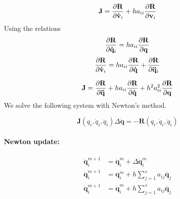 \documentclass[pdftex,11pt,letter]{article}
\begin{document}
\begin{equation}
  \mathbf{J} = \dfrac{\partial \mathbf{R}}{\partial \mathbf{\dot{v}}_{i}} + h a_{ii}
  \dfrac{\partial \mathbf{R}}{\partial \mathbf{v}_{i}}
\end{equation}
Using the relations
\begin{equation}
  \dfrac{\partial \mathbf{R}}{\partial \mathbf{\dot{q}}_{i}} = h a_{ii} \dfrac{\partial \mathbf{R}}{\partial \mathbf{{q}}}
\end{equation}
\begin{equation}
  \dfrac{\partial \mathbf{R}}{\partial \mathbf{\dot{v}}_{i}} = h a_{ii} \dfrac{\partial \mathbf{R}}{\partial \mathbf{\dot{q}}} + \dfrac{\partial \mathbf{R}}{\partial \mathbf{\ddot{q}}_{i}}
\end{equation}

\begin{equation}
  \mathbf{J} = \dfrac{\partial \mathbf{R}}{\partial \mathbf{\ddot{q}}} + h a_{ii}
  \dfrac{\partial \mathbf{R}}{\partial \mathbf{\dot{q}}} + h^2 a_{ii}^2
  \dfrac{\partial \mathbf{R}}{\partial \mathbf{{q}}}
\end{equation}
We solve the following system with Newton's method.

\begin{equation}
 \mathbf{J} \left(q_i,\dot{q}_i,\ddot{q}_i\right) \Delta\mathbf{\dot{q}} = -\mathbf{R}  \left(q_i,\dot{q}_i,\ddot{q}_i\right)
\end{equation}

\paragraph{Newton update:}

\begin{equation}
  \begin{split}
    \ddot{\mathbf{q}}_i^{m+1} & = \ddot{\mathbf{q}}_i^{m}  + \Delta \ddot{\mathbf{q}}_i^m\\
    \dot{\mathbf{q}}_i^{m+1} & = {\mathbf{q}}_i^{m}  + h \sum_{j=1}^s a_{ij} \dot{\mathbf{q}_j}\\
    \ddot{\mathbf{q}}_i^{m+1} & = \dot{\mathbf{q}}_i^{m}  + h \sum_{j=1}^s a_{ij} \ddot{\mathbf{q}_j}\\
  \end{split}
\end{equation}
\end{document}

